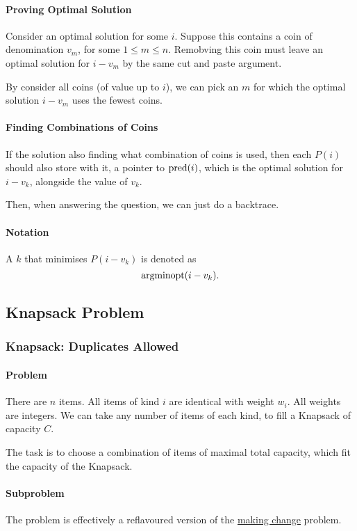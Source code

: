 \paragraph{Proving Optimal Solution}
Consider an optimal solution for some \(i\).
Suppose this contains a coin of denomination  \(v_m\), for some  \(1 \leq m \leq n\).
Remobving this coin must leave an optimal solution for \(i - v_m\) by the
same cut and paste argument.

By consider all coins (of value up to \(i\)), we can pick an \(m\)
for which the optimal solution  \(i - v_m\) uses the fewest coins.

\paragraph{Finding Combinations of Coins}
If the solution also finding what combination of coins is used, then each
\(P(i)\) should also store with it, a pointer to  \(\mathrm{pred}(i)\), which is
the optimal solution for \(i - v_k\), alongside the value of  \(v_k\).

Then, when answering the question, we can just do a backtrace.

\paragraph{Notation}
A \(k\) that minimises \(P(i  - v_k)\) is denoted as \[
  \mathrm{argmin} \mathrm{opt}(i - v_k)
.\] 

\subsection{Knapsack Problem}

\subsubsection{Knapsack: Duplicates Allowed}
\paragraph{Problem}
There are \(n\) items. All items of kind  \(i\) are identical with weight  \(w_i\).
All weights are integers. We can take any number of items of each kind,
to fill a Knapsack of capacity \(C\).

The task is to choose a combination of items of maximal total capacity,
which fit the capacity of the Knapsack.

\paragraph{Subproblem}
The problem is effectively  a reflavoured version of the \underline{making change}
problem.

